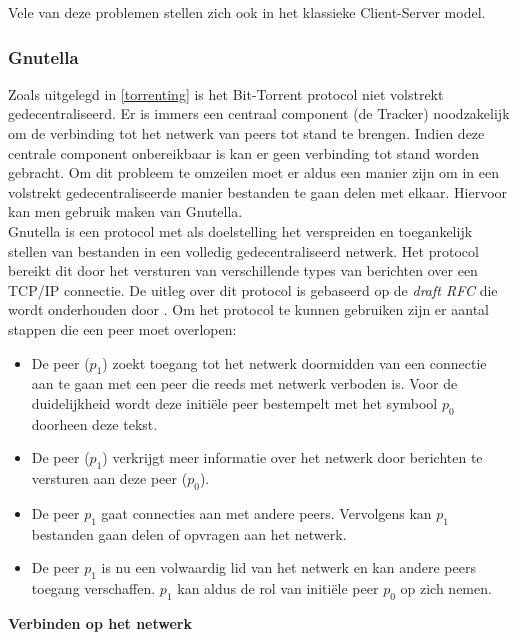 Vele van deze problemen stellen zich ook in het klassieke Client-Server model.

\subsubsection{Gnutella}
\label{Gnutella}
Zoals uitgelegd in \ref{torrenting} is het Bit-Torrent protocol niet volstrekt gedecentraliseerd. Er is immers een centraal component (de Tracker) noodzakelijk om de verbinding tot het netwerk van peers tot stand te brengen. Indien deze centrale component onbereikbaar is kan er geen verbinding tot stand worden gebracht. Om dit probleem te omzeilen moet er aldus een manier zijn om in een volstrekt gedecentraliseerde manier bestanden te gaan delen met elkaar. Hiervoor kan men gebruik maken van Gnutella.\\

Gnutella is een protocol met als doelstelling het verspreiden en toegankelijk stellen van bestanden in een volledig gedecentraliseerd netwerk. Het protocol bereikt dit door het versturen van verschillende types van berichten over een TCP/IP connectie. De uitleg over dit protocol is gebaseerd op de \textit{draft RFC} die wordt onderhouden door \textcite{Klingberg2002}. Om het protocol te kunnen gebruiken zijn er aantal stappen die een peer moet overlopen:

\begin{itemize}
\item De peer ($p_1$) zoekt toegang tot het netwerk doormidden van een connectie aan te gaan met een peer die reeds met netwerk verboden is. Voor de duidelijkheid wordt deze initiële peer bestempelt met het symbool $p_0$ doorheen deze tekst.\\
\item De peer ($p_1$) verkrijgt meer informatie over het netwerk door berichten te versturen aan deze peer ($p_0$).\\
\item De peer $p_1$ gaat connecties aan met andere peers. Vervolgens kan $p_1$ bestanden gaan delen of opvragen aan het netwerk.\\
\item De peer $p_1$ is nu een volwaardig lid van het netwerk en kan andere peers toegang verschaffen. $p_1$ kan aldus de rol van initiële peer $p_0$ op zich nemen.
\end{itemize}


\textbf{Verbinden op het netwerk}\\

